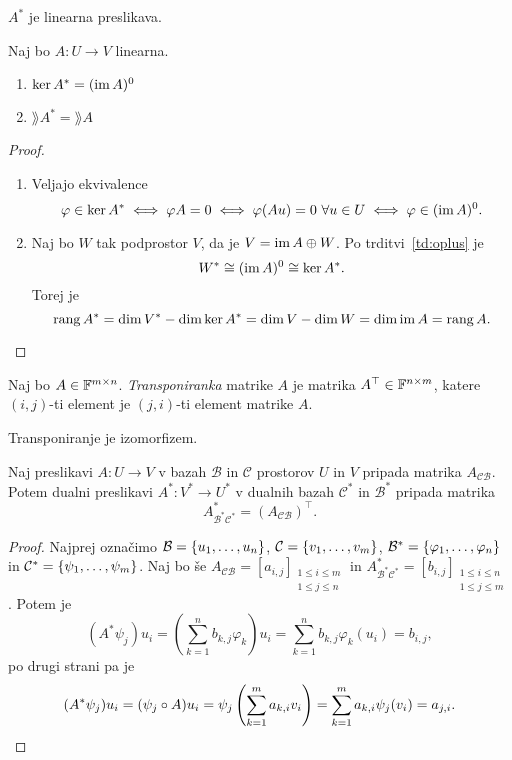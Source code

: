 \documentclass[12pt, a4paper]{article}
\begin{document}
\begin{trditev}
$A^*$ je linearna preslikava.
\end{trditev}

\obvs

\begin{izrek}\label{iz:rang}
Naj bo $A\colon U\to V$ linearna.
\begin{enumerate}[label=\roman*)]
\item $\ker A^*=(\operatorname{im} A)^0$
\item $\rang A^*=\rang A$
\end{enumerate}
\end{izrek}

\begin{proof}
\begin{enumerate}[label=\roman*)]
\item Veljajo ekvivalence
\[
\varphi\in\ker A^*\iff \varphi A=0\iff \varphi(Au)=0~\forall u\in U\iff \varphi\in(\operatorname{im} A)^0.
\]
\item Naj bo $W$ tak podprostor $V$, da je $V=\operatorname{im} A\oplus W$. Po trditvi~\ref{td:oplus} je
\[
W^*\cong (\operatorname{im} A)^0\cong\ker A^*.
\]
Torej je
\[
\operatorname{rang} A^*=\dim V^*-\dim\ker A^*=\dim V-\dim W=\dim\operatorname{im} A=\operatorname{rang} A.\qedhere
\]
\end{enumerate}
\end{proof}

\begin{definicija}
Naj bo $A\in\mathbb{F}^{m\times n}$. \emph{Transponiranka} matrike $A$ je matrika $A^\top\in\mathbb{F}^{n\times m}$, katere $(i,j)$-ti element je $(j,i)$-ti element matrike $A$.
\end{definicija}

\begin{posledica}
Transponiranje je izomorfizem.
\end{posledica}

\begin{izrek}
Naj preslikavi $A\colon U\to V$ v bazah $\mathcal{B}$ in $\mathcal{C}$ prostorov $U$ in $V$ pripada matrika $A_{\mathcal{CB}}$. Potem dualni preslikavi $A^*\colon V^*\to U^*$ v dualnih bazah $\mathcal{C}^*$ in $\mathcal{B}^*$ pripada matrika
\[
A^*_{\mathcal{B}^*\mathcal{C}^*}=(A_{\mathcal{CB}})^\top.
\]
\end{izrek}

\begin{proof}
Najprej označimo $\mathcal{B}=\left\{u_1,\dots,u_n\right\}$, $\mathcal{C}=\left\{v_1,\dots,v_m\right\}$, $\mathcal{B}^*=\left\{\varphi_1,\dots,\varphi_n\right\}$ in $\mathcal{C}^*=\left\{\psi_1,\dots,\psi_m\right\}$. Naj bo še $A_{\mathcal{CB}}=[a_{i,j}]_{
\substack{
1\leq i\leq m \\
1\leq j\leq n}}$ in 
$A^*_{\mathcal{B}^*\mathcal{C}^*}=[b_{i,j}]_{
\substack{
1\leq i\leq n \\
1\leq j\leq m}}$. Potem je
\[
(A^*\psi_j)u_i=\left(\sum_{k=1}^n b_{k,j}\varphi_k\right)u_i
=\sum_{k=1}^n b_{k,j}\varphi_k(u_i)
=b_{i,j},
\]
po drugi strani pa je
\[
(A^*\psi_j)u_i=(\psi_j\circ A)u_i
=\psi_j\left(\sum_{k=1}^m a_{k,i}v_i\right)
=\sum_{k=1}^m a_{k,i}\psi_j(v_i)
=a_{j,i}.\qedhere
\]
\end{proof}
\end{document}
